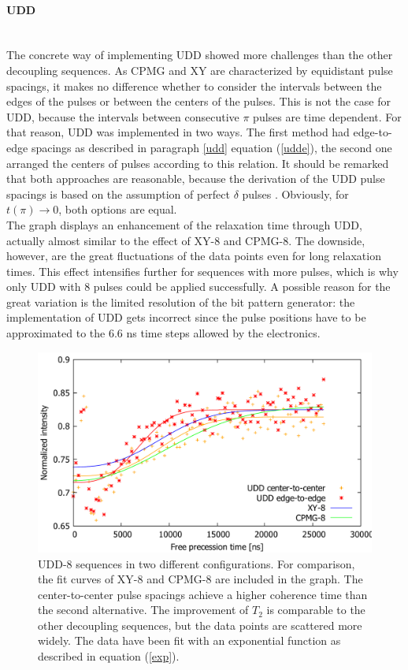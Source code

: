 \documentclass[12pt,a4paper]{article}
\begin{document}
\paragraph{UDD}\mbox{}\\
The concrete way of implementing UDD showed more challenges than the other decoupling sequences. As CPMG and XY are characterized by equidistant pulse spacings, it makes no difference whether to consider the intervals between the edges of the pulses or between the centers of the pulses. This is not the case for UDD, because the intervals between consecutive $\pi$ pulses are time dependent. For that reason, UDD was implemented in two ways. The first method had edge-to-edge spacings as described in paragraph \ref{udd} equation (\ref{udde}), the second one arranged the centers of pulses according to this relation. It should be remarked that both approaches are reasonable, because the derivation of the UDD pulse spacings is based on the assumption of perfect $\delta$ pulses \cite{udd}. Obviously, for $t(\pi)\rightarrow 0$, both options are equal.\\
The graph displays an enhancement of the relaxation time through UDD, actually almost similar to the effect of XY-8 and CPMG-8. The downside, however, are the great fluctuations of the data points even for long relaxation times. This effect intensifies further for sequences with more pulses, which is why only UDD with 8 pulses could be applied successfully. A possible reason for the great variation is the limited resolution of the bit pattern generator: the implementation of UDD gets incorrect since the pulse positions have to be approximated to the 6.6 ns time steps allowed by the electronics.
\\
\begin{figure}[H] 
\includegraphics[scale=0.6]{udd8.pdf} 
\caption{UDD-8 sequences in two different configurations. For comparison, the fit curves of XY-8 and CPMG-8 are included in the graph. The center-to-center pulse spacings achieve a higher coherence time than the second alternative. The improvement of $T_2$ is comparable to the other decoupling sequences, but the data points are scattered more widely. The data have been fit with an exponential function as described in equation (\ref{exp}).}
\label{U8}
\end{figure}
\end{document}

